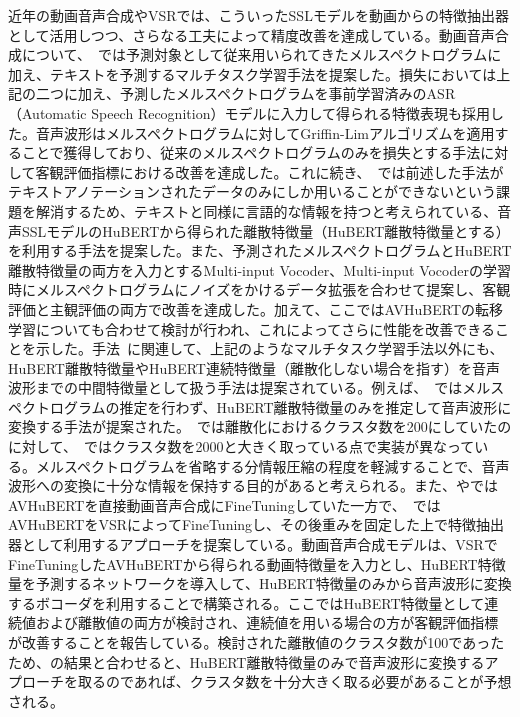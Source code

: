 \documentclass[12pt]{jarticle}
\numberwithin{equation}{section}    %
\numberwithin{figure}{section}      %
\numberwithin{table}{section}      %
\begin{document}
近年の動画音声合成やVSRでは、こういったSSLモデルを動画からの特徴抽出器として活用しつつ、さらなる工夫によって精度改善を達成している。動画音声合成について、~\cite{kim2023lip_multitask}では予測対象として従来用いられてきたメルスペクトログラムに加え、テキストを予測するマルチタスク学習手法を提案した。損失においては上記の二つに加え、予測したメルスペクトログラムを事前学習済みのASR（Automatic Speech Recognition）モデルに入力して得られる特徴表現も採用した。音声波形はメルスペクトログラムに対してGriffin-Limアルゴリズムを適用することで獲得しており、従来のメルスペクトログラムのみを損失とする手法に対して客観評価指標における改善を達成した。これに続き、~\cite{choi2023intelligible}では前述した手法がテキストアノテーションされたデータのみにしか用いることができないという課題を解消するため、テキストと同様に言語的な情報を持つと考えられている、音声SSLモデルのHuBERT\cite{hsu2021hubert}から得られた離散特徴量（HuBERT離散特徴量とする）を利用する手法を提案した。また、予測されたメルスペクトログラムとHuBERT離散特徴量の両方を入力とするMulti-input Vocoder、Multi-input Vocoderの学習時にメルスペクトログラムにノイズをかけるデータ拡張を合わせて提案し、客観評価と主観評価の両方で改善を達成した。加えて、ここではAVHuBERTの転移学習についても合わせて検討が行われ、これによってさらに性能を改善できることを示した。手法~\cite{choi2023intelligible}に関連して、上記のようなマルチタスク学習手法以外にも、HuBERT離散特徴量やHuBERT連続特徴量（離散化しない場合を指す）を音声波形までの中間特徴量として扱う手法は提案されている。例えば、~\cite{hsu2023revise}ではメルスペクトログラムの推定を行わず、HuBERT離散特徴量のみを推定して音声波形に変換する手法が提案された。~\cite{choi2023intelligible}では離散化におけるクラスタ数を200にしていたのに対して、~\cite{hsu2023revise}ではクラスタ数を2000と大きく取っている点で実装が異なっている。メルスペクトログラムを省略する分情報圧縮の程度を軽減することで、音声波形への変換に十分な情報を保持する目的があると考えられる。また、\cite{choi2023intelligible}や\cite{hsu2023revise}ではAVHuBERTを直接動画音声合成にFineTuningしていた一方で、~\cite{sahipjohn2023robustl2s}ではAVHuBERTをVSRによってFineTuningし、その後重みを固定した上で特徴抽出器として利用するアプローチを提案している。動画音声合成モデルは、VSRでFineTuningしたAVHuBERTから得られる動画特徴量を入力とし、HuBERT特徴量を予測するネットワークを導入して、HuBERT特徴量のみから音声波形に変換するボコーダを利用することで構築される。ここではHuBERT特徴量として連続値および離散値の両方が検討され、連続値を用いる場合の方が客観評価指標が改善することを報告している。検討された離散値のクラスタ数が100であったため、\cite{hsu2023revise}の結果と合わせると、HuBERT離散特徴量のみで音声波形に変換するアプローチを取るのであれば、クラスタ数を十分大きく取る必要があることが予想される。
\end{document}

